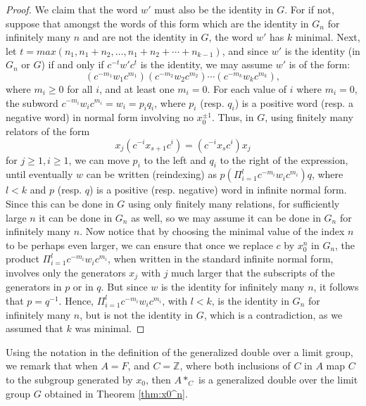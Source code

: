 \documentclass[11pt]{amsart}
\begin{document}
\begin{proof}
We claim that the word $w'$ must also be the identity in $G$. For if not,
suppose that amongst the words of this form which are the identity
in $G_n$ for infinitely many $n$ and are not the identity in $G$,
the word $w'$ has $k$ minimal. Next, let $t=max(n_1, n_1+n_2, \ldots,
n_1+n_2+\cdots+n_{k-1})$, and since $w'$ is the identity (in
$G_n$ or $G$) if and only if $c^{-t}w'c^t$ is the identity, we may
assume $w'$ is of the form:
$$(c^{-m_1}w_1c^{m_1})(c^{-m_2}w_2c^{m_2})\cdots
(c^{-m_k}w_kc^{m_k}),$$ where $m_i\geq 0$ for all $i$, and at least
one $m_i=0$. For each value of $i$ where $m_i=0$, the subword
$c^{-m_i}w_ic^{m_i}=w_i=p_iq_i$, where $p_i$ (resp.
$q_i$) is a positive word (resp. a negative word) in normal
form involving no $x_0^{\pm1}$. Thus, in $G$, using finitely many
relators of the form $$x_{j} (c^{-i}
x_{s+1}c^i)=(c^{-i}x_sc^i)x_j$$ for $j \geq 1, i \geq 1$, we can
move $p_i$ to the left and $q_i$ to the right of the expression, until eventually
$w$ can be written (reindexing) as $p (\Pi_{i=1}^l
c^{-m_i}w_ic^{m_i})q$, where $l<k$ and $p$ (resp. $q$) is a
positive (resp. negative) word in infinite normal form.
Since this can be done in $G$ using only finitely many relations, for
sufficiently large $n$ it can be done in $G_n$ as well, so we may
assume it can be done in $G_n$ for infinitely many $n$. Now notice
that by choosing the minimal value of the index $n$ to be perhaps even
larger, we can ensure that once we replace $c$ by $x_0^n$ in
$G_n$, the product $\Pi_{i=1}^l c^{-m_i}w_ic^{m_i}$, when written in the standard infinite
normal form, involves only the generators $x_j$ with $j$ much
larger that the subscripts of the generators in $p$ or in $q$. But
since $w$ is the identity for infinitely many $n$, it follows that
$p=q^{-1}$. Hence, $\Pi_{i=1}^l c^{-m_i}w_ic^{m_i}$, with $l <k$,
is the identity in $G_n$ for infinitely many $n$, but is not the
identity in $G$, which is a contradiction, as we assumed that $k$ was minimal.
\end{proof}

Using the notation in the definition of the generalized double over a limit group, we remark that when
$A = F$, and $C = {\mathbb Z}$, where both inclusions of $C$ in $A$ map $C$ to the subgroup generated by $x_0$, then $A *_C$ is a generalized double over the limit group $G$ obtained in Theorem \ref{thm:x0^n}.
\end{document}
